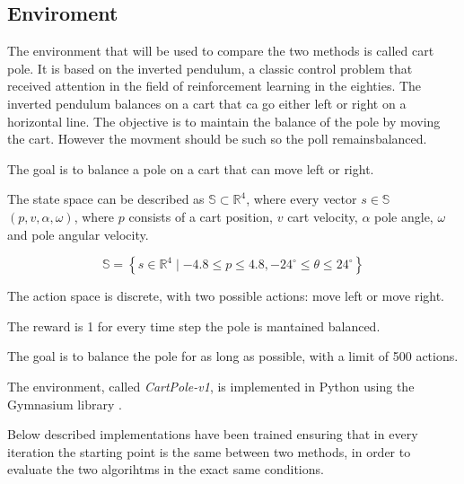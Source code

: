 \subsection{Enviroment}
The environment that will be used to compare the two methods is called cart pole. It is based on the inverted pendulum, a classic control problem that received attention in the field of reinforcement learning in the eighties. The inverted pendulum balances on a cart that ca go either left or right on a horizontal line. The objective is to maintain the balance of the pole by moving the cart. However the movment should be such so the poll remainsbalanced\cite{moriarty1996efficient}.

The goal is to balance a pole on a cart that can move left or right. 

The state space can be described as $ \mathbb{S} \subset \mathbb{R}^4 $, where every vector $s \in \mathbb{S}$ $(p, v, \alpha, \omega)$, where $p$ consists of a cart position, $v$ cart velocity, $\alpha$ pole angle, $\omega$ and pole angular velocity.

\begin{equation} \label{eqStateSpace}
{\mathbb{S} = \left\{ s \in \mathbb{R}^4 \mid -4.8 \leq p \leq 4.8, 
 -24^\circ \leq \theta \leq 24^\circ \right\}}
\end{equation}

The action space is discrete, with two possible actions: move left or move right. 

The reward is 1 for every time step the pole is mantained balanced.

The goal is to balance the pole for as long as possible, with a limit of 500 actions.

The environment, called \textit{CartPole-v1}, is implemented in Python using the Gymnasium library \cite{towers_gymnasium_2023}. 

Below described implementations have been trained ensuring that in every iteration the starting point is the same between two methods, in order to evaluate the two algorihtms in the exact same conditions.

